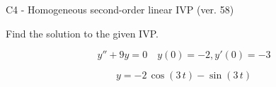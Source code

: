 \begin{exercise}
  \begin{exerciseTitle}C4 - Homogeneous second-order linear IVP (ver. 58)\end{exerciseTitle}
  \begin{exerciseStatement}
    
Find the solution to the given IVP.

    
\[y''+9y = 0 \hspace{1em} y(0) = -2 , y'(0) = -3\]

  \end{exerciseStatement}
  \begin{exerciseAnswer}
    
\[y= -2 \, \cos\left(3 \, t\right) - \sin\left(3 \, t\right)\]

  \end{exerciseAnswer}
\end{exercise}